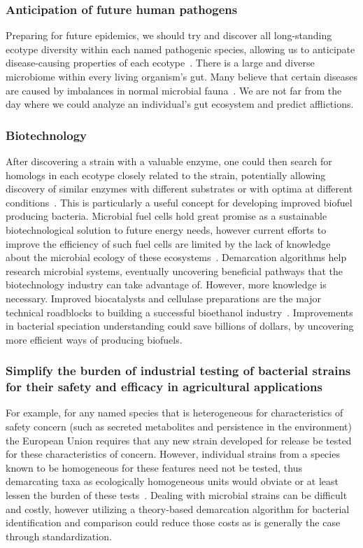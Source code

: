 \subsubsection*{Anticipation of future human pathogens}
Preparing for future epidemics, we should try and discover all long-standing ecotype diversity within each named pathogenic species, allowing us to anticipate disease-causing properties of each ecotype~\cite{cohan2007systematics}.
There is a large and diverse microbiome within every living organism's gut.
Many believe that certain diseases are caused by imbalances in normal microbial fauna~\cite{ballal2011host}.
We are not far from the day where we could analyze an individual's gut ecosystem and predict afflictions.

\subsubsection*{Biotechnology}
After discovering a strain with a valuable enzyme, one could then search for homologs in each ecotype closely related to the strain, potentially allowing discovery of similar enzymes with different substrates or with optima at different conditions~\cite{cohan2007systematics}.
This is particularly a useful concept for developing improved biofuel producing bacteria.
Microbial fuel cells hold great promise as a sustainable biotechnological solution to future energy needs, however current efforts to improve the efficiency of such fuel cells are limited by the lack of knowledge about the microbial ecology of these ecosystems~\cite{rabaey2004biofuel}.
Demarcation algorithms help research microbial systems, eventually uncovering beneficial pathways that the biotechnology industry can take advantage of.
However, more knowledge is necessary.
Improved biocatalysts and cellulase preparations are the major technical roadblocks to building a successful bioethanol industry~\cite{dien2003bacteria}.
Improvements in bacterial speciation understanding could save billions of dollars, by uncovering more efficient ways of producing biofuels.

\subsubsection*{Simplify the burden of industrial testing of bacterial strains for their safety and efficacy in agricultural applications}
For example, for any named species that is heterogeneous for characteristics of safety concern (such as secreted metabolites and persistence in the environment) the European Union requires that any new strain developed for release be tested for these characteristics of concern.
However, individual strains from a species known to be homogeneous for these features need not be tested, thus demarcating taxa as ecologically homogeneous units would obviate or at least lessen the burden of these tests~\cite{cohan2007systematics}.
Dealing with microbial strains can be difficult and costly, however utilizing a theory-based demarcation algorithm for bacterial identification and comparison could reduce those costs as is generally the case through standardization.

